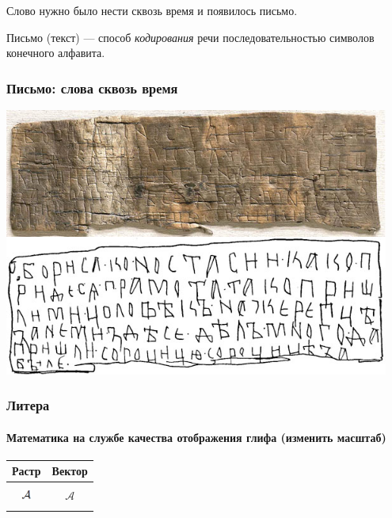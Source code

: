 Слово нужно было нести сквозь время и появилось письмо.

\begin{frame}
    \begin{center}
        Письмо (текст) --- способ \emph{кодирования} речи последовательностью символов конечного алфавита.
    \end{center}
\end{frame}

\begin{frame}
    \frametitle{Письмо: слова сквозь время}
    
    \begin{center}
        \includegraphics[width=0.95\textwidth]{fig/beresta}
    \end{center}
\end{frame}

\begin{frame}
    \frametitle{Литера}
    \framesubtitle{Математика на службе качества отображения глифа (изменить масштаб)}
    
    \begin{center}
        \begin{tabular}{c|c}
            \hline\hline
            Растр 
                & Вектор \\ \hline\hline
                & \\
            \includegraphics[height=10pt]{fig/aletter}
                & $\mathcal{A}$ \\
                & \\ \hline
        \end{tabular}
    \end{center}
\end{frame}

